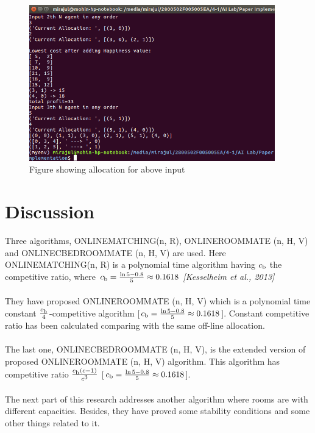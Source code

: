 \documentclass[12pt]{article}
\begin{document}
\begin{figure}[H]
	\includegraphics[width=0.95\textwidth, center]{2}
	\caption{Figure showing allocation for above input}
	\label{fig:figure2}
\end{figure}


\newpage

\section*{Discussion}
Three algorithms, ONLINEMATCHING(n, R),  ONLINEROOMMATE (n, H, V) and ONLINECBEDROOMMATE (n, H, V) are used. Here ONLINEMATCHING(n, R) is a polynomial time algorithm having $c\textsubscript b$ the competitive ratio, where $c\textsubscript b = \frac{\ln 5 - 0.8}{5} \approx 0.1618$ \textit{[Kesselheim et al., 2013]}\\\\
They have proposed ONLINEROOMMATE (n, H, V) which is a polynomial time constant $\frac{c\textsubscript b}{4}$-competitive algorithm [$c\textsubscript b = \frac{\ln 5 - 0.8}{5} \approx 0.1618$]. Constant competitive ratio has been calculated comparing with the same off-line allocation. \\\\
The last one, ONLINECBEDROOMMATE (n, H, V), is the extended version of proposed ONLINEROOMMATE (n, H, V) algorithm. This algorithm has competitive ratio $\frac{c\textsubscript b (c - 1)}{c\textsuperscript 3}$ [$c\textsubscript b = \frac{\ln 5 - 0.8}{5} \approx 0.1618$].\\\\
The next part of this research addresses another algorithm where rooms are with different capacities. Besides, they have proved some stability conditions and some other things related to it. 
 
\end{document}
